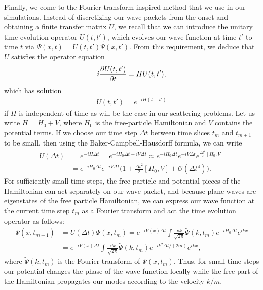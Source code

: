 Finally, we come to the Fourier transform inspired method that we use in our simulations.
Instead of discretizing our wave packets from the onset and obtaining a finite transfer matrix $U$, we recall that we can introduce the unitary time evolution operator $U(t,t')$, which evolves our wave function at time $t'$ to time $t$ via $\Psi(x,t) = U(t,t') \Psi(x,t')$.
From this requirement, we deduce that $U$ satisfies the operator equation
\begin{align}
    i \pdv{U(t,t')}{t} = H U(t,t')
,\end{align}
which has solution
\begin{align}
    U(t,t') = e^{-i H (t - t')}
\end{align}
if $H$ is independent of time as will be the case in our scattering problems.
Let us write $H = H_0 + V$, where $H_0$ is the free-particle Hamiltonian and $V$ contains the potential terms.
If we choose our time step $\Delta t$ between time slices $t_{m}$ and $t_{m+1}$ to be small, then using the Baker-Campbell-Hausdorff formula, we can write
\begin{align}
    U(\Delta t) &= e^{-i H \Delta t} = e^{-i H_0 \Delta t - i V \Delta t} \approx e^{-i H_0 \Delta t} e^{-i V \Delta t} e^{\frac{\Delta t^2}{2} [H_0, V]} \nonumber \\
                &= e^{-i H_0 \Delta t} e^{-i V \Delta t} \Big( 1 + \frac{\Delta t^2}{2} [H_0,V] + \mathcal{O}(\Delta t^{4}) \Big)
.\end{align}
For sufficiently small time steps, the free particle and potential pieces of the Hamiltonian can act separately on our wave packet, and because plane waves are eigenstates of the free particle Hamiltonian, we can express our wave function at the current time step $t_{m}$ as a Fourier transform and act the time evolution operator as follows:
\begin{align}
    \Psi(x,t_{m+1}) &= U(\Delta t) \Psi(x,t_{m}) = e^{-i V(x) \Delta t} \int \frac{\dd{k}}{\sqrt{2 \pi}} \widetilde{\Psi}(k,t_{m}) e^{-i H_0 \Delta t} e^{i k x} \nonumber \\
    &= e^{-i V(x) \Delta t} \int \frac{\dd{k}}{\sqrt{2 \pi}} \widetilde{\Psi}(k,t_{m}) e^{- i k^2 \Delta t / (2m)} e^{i k x}
,\end{align}
where $\widetilde{\Psi}(k,t_{m})$ is the Fourier transform of $\Psi(x,t_{m})$.
Thus, for small time steps our potential changes the phase of the wave-function locally while the free part of the Hamiltonian propagates our modes according to the velocity $k/m$.

